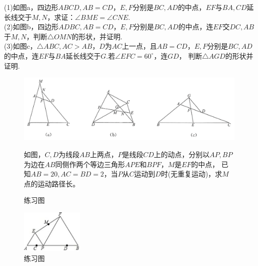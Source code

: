 \documentclass{ecnuthesis}
\begin{document}
\begin{problem}
    (1)如图a，四边形$ABCD,AB=CD$，$E,F$分别是$BC,AD$的中点，$EF$与$BA,CD$延长线交于$M,N$，求证：$\angle BME=\angle CNE$. \\
    (2)如图b，四边形$ADBC,AB=CD$，$E,F$分别是$BC,AD$的中点，连$EF$交$DC,AB$于$M,N$，判断$\triangle OMN$的形状，并证明. \\
    (3)如图c，$\triangle ABC,AC>AB$，$D$为$AC$上一点，且$AB=CD$，$E,F$分别是$BC,AD$的中点，连$EF$与$BA$延长线交于$G$.若$\angle EFC=60^\circ$，连$GD$，
    判断$\triangle AGD$的形状并证明.
\end{problem}
\begin{figure}[H]
\centering
\includegraphics[width=12cm]{picture/630.png}
\caption{练习图}
\begin{problem}
    如图，$C,D$为线段$AB$上两点，$P$是线段$CD$上的动点，分别以$AP,BP$为边在$AB$同侧作两个等边三角形$APE$和$BPF$，$M$是$EF$的中点，
    已知$AB=20,AC=BD=2$，当$P$从$C$运动到$D$时(无重复运动)，求$M$点的运动路径长。
\end{problem}
\end{figure}
\begin{figure}[H]
\centering
\includegraphics[width=3cm]{picture/632.png}
\caption{练习图}
\end{figure}
\clearpage
\end{document}
